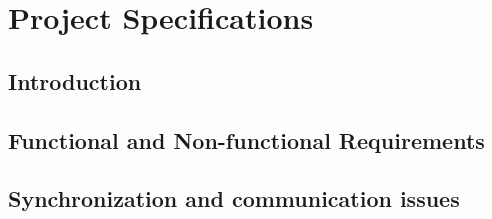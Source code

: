 \chapter{Project Specifications}
\section{Introduction}



\section{Functional and Non-functional Requirements}



\section{Synchronization and communication issues}


